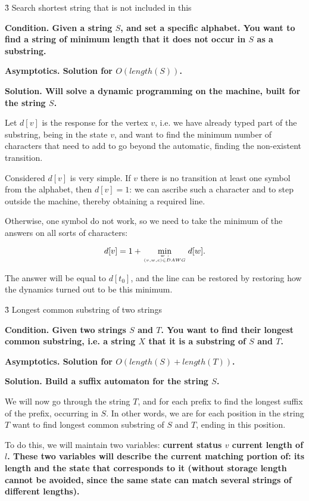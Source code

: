\h3{ Search shortest string that is not included in this }

\bf{Condition}. Given a string $S$, and set a specific alphabet. You want to find a string of minimum length that it does not occur in $S$ as a substring.

\bf{Asymptotics}. Solution for $O (length (S))$.

\bf{Solution}. Will solve a dynamic programming on the machine, built for the string $S$.

Let $d[v]$ is the response for the vertex $v$, i.e. we have already typed part of the substring, being in the state $v$, and want to find the minimum number of characters that need to add to go beyond the automatic, finding the non-existent transition.

Considered $d[v]$ is very simple. If $v$ there is no transition at least one symbol from the alphabet, then $d[v] = 1$: we can ascribe such a character and to step outside the machine, thereby obtaining a required line.

Otherwise, one symbol do not work, so we need to take the minimum of the answers on all sorts of characters:

$$ d[v] = 1 + \min_{w ~ : \atop (v,w,c) \in DAWG} d[w]. $$

The answer will be equal to $d[t_0]$, and the line can be restored by restoring how the dynamics turned out to be this minimum.


\h3{ Longest common substring of two strings }

\bf{Condition}. Given two strings $S$ and $T$. You want to find their longest common substring, i.e. a string $X$ that it is a substring of $S$ and $T$.

\bf{Asymptotics}. Solution for $O (length(S) + length(T))$.

\bf{Solution}. Build a suffix automaton for the string $S$.

We will now go through the string $T$, and for each prefix to find the longest suffix of the prefix, occurring in $S$. In other words, we are for each position in the string $T$ want to find longest common substring of $S$ and $T$, ending in this position.

To do this, we will maintain two variables: \bf{current status} $v$ \bf{current length} of $l$. These two variables will describe the current matching portion of: its length and the state that corresponds to it (without storage length cannot be avoided, since the same state can match several strings of different lengths).

